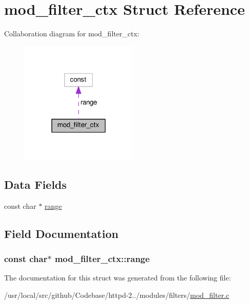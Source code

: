 \hypertarget{structmod__filter__ctx}{}\section{mod\+\_\+filter\+\_\+ctx Struct Reference}
\label{structmod__filter__ctx}


Collaboration diagram for mod\+\_\+filter\+\_\+ctx\+:
\nopagebreak
\begin{figure}[H]
\begin{center}
\leavevmode
\includegraphics[width=158pt]{structmod__filter__ctx__coll__graph}
\end{center}
\end{figure}
\subsection*{Data Fields}
\begin{DoxyCompactItemize}
\item 
const char $\ast$ \hyperlink{structmod__filter__ctx_a987ae8e0b3139c1fc2c697aa8d7998b9}{range}
\end{DoxyCompactItemize}


\subsection{Field Documentation}
\subsubsection[{\texorpdfstring{range}{range}}]{\setlength{\rightskip}{0pt plus 5cm}const char$\ast$ mod\+\_\+filter\+\_\+ctx\+::range}\hypertarget{structmod__filter__ctx_a987ae8e0b3139c1fc2c697aa8d7998b9}{}\label{structmod__filter__ctx_a987ae8e0b3139c1fc2c697aa8d7998b9}


The documentation for this struct was generated from the following file\+:\begin{DoxyCompactItemize}
\item 
/usr/local/src/github/\+Codebase/httpd-\/2../modules/filters/\hyperlink{mod__filter_8c}{mod\+\_\+filter.\+c}\end{DoxyCompactItemize}
